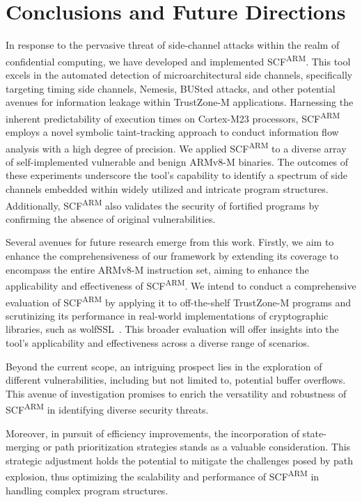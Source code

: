 \section{Conclusions and Future Directions}

In response to the pervasive threat of side-channel attacks within the realm of confidential computing, we have developed and implemented \ac{SCF}\textsuperscript{ARM}. This tool excels in the automated detection of microarchitectural side channels, specifically targeting timing side channels, Nemesis, BUSted attacks, and other potential avenues for information leakage within TrustZone-M applications. Harnessing the inherent predictability of execution times on Cortex-M23 processors, \ac{SCF}\textsuperscript{ARM} employs a novel symbolic taint-tracking approach to conduct information flow analysis with a high degree of precision. We applied \ac{SCF}\textsuperscript{ARM} to a diverse array of self-implemented vulnerable and benign ARMv8-M binaries. The outcomes of these experiments underscore the tool's capability to identify a spectrum of side channels embedded within widely utilized and intricate program structures. Additionally, \ac{SCF}\textsuperscript{ARM} also validates the security of fortified programs by confirming the absence of original vulnerabilities.

Several avenues for future research emerge from this work. Firstly, we aim
to enhance the comprehensiveness of our framework by extending its coverage
to encompass the entire ARMv8-M instruction set, aiming to enhance the
applicability and effectiveness of \ac{SCF}\textsuperscript{ARM}. We intend
to conduct a comprehensive evaluation of \ac{SCF}\textsuperscript{ARM} by
applying it to off-the-shelf TrustZone-M programs and scrutinizing its
performance in real-world implementations of cryptographic libraries, such
as wolfSSL~\cite{wolfssl}. This broader evaluation will offer insights into the tool's applicability and effectiveness across a diverse range of scenarios.

Beyond the current scope, an intriguing prospect lies in the exploration of different vulnerabilities, including but not limited to, potential buffer overflows. This avenue of investigation promises to enrich the versatility and robustness of \ac{SCF}\textsuperscript{ARM} in identifying diverse security threats.

Moreover, in pursuit of efficiency improvements, the incorporation of state-merging \cite{kuznetsov2012efficient} or path prioritization strategies \cite{baldoni2018survey, li2013steering} stands as a valuable consideration. This strategic adjustment holds the potential to mitigate the challenges posed by path explosion, thus optimizing the scalability and performance of \ac{SCF}\textsuperscript{ARM} in handling complex program structures.


